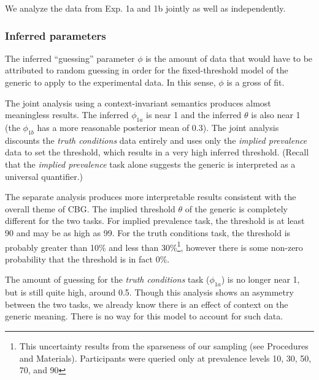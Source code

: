 \documentclass[10pt,letterpaper]{article}
\newcommand{\red}[1]{\textcolor{Red}{#1}}
\begin{document}
%
%	
%		
%			

We analyze the data from Exp. 1a and 1b jointly as well as independently.

\subsubsection{Inferred parameters}

The inferred ``guessing'' parameter $\phi$ is the amount of data that would have to be attributed to random guessing in order for the fixed-threshold model of the generic to apply to the experimental data. In this sense, $\phi$ is a gross of fit. 

The joint analysis using a context-invariant semantics produces almost meaningless results. The inferred $\phi_{1a}$ is near 1 and the inferred $\theta$ is also near 1 (the $\phi_{1b}$ has a more reasonable posterior mean of 0.3). The joint analysis discounts the \emph{truth conditions} data entirely and uses only the \emph{implied prevalence} data to set the threshold, which results in a very high inferred threshold. (Recall that the \emph{implied prevalence} task alone suggests the generic is interpreted as a universal quantifier.)

The separate analysis produces more interpretable results consistent with the overall theme of CBG. The implied threshold $\theta$ of the generic is completely different for the two tasks. For implied prevalence task, the threshold is at least 90 and may be as high as 99. For the truth conditions task, the threshold is probably greater than 10\% and less than 30\%\footnote{This uncertainty results from the sparseness of our sampling (see Procedures and Materials). Participants were queried only at prevalence levels 10, 30, 50, 70, and 90}, however there is some non-zero probability that the threshold is in fact 0\%. 

The amount of guessing for the \emph{truth conditions} task ($\phi_{1a}$) is no longer near 1, but is still quite high, around 0.5. Though this analysis shows an asymmetry between the two tasks, we already know there is an effect of context on the generic meaning. There is no way for this model to account for such data.
\end{document}
